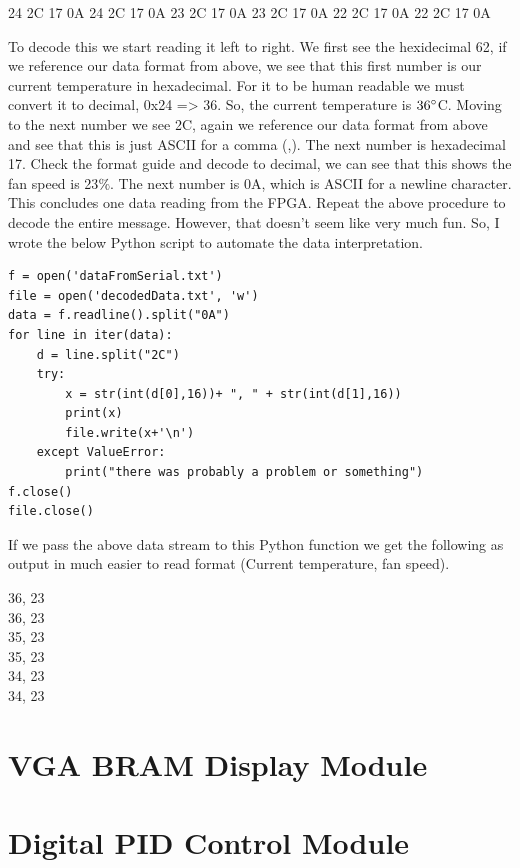 \documentclass{article}
\begin{document}
\begin{center}
	24 2C 17 0A 24 2C 17 0A 23 2C 17 0A 23 2C 17 0A 22 2C 17 0A 22 2C 17 0A\\
\end{center}
To decode this we start reading it left to right. We first see the hexidecimal 62, if we reference our data format from above, we see that this first number is our current temperature in hexadecimal. For it to be human readable we must convert it to decimal, 0x24 => 36. So, the current temperature is $36\degree$C. Moving to the next number we see 2C, again we reference our data format from above and see that this is just ASCII for a comma (,). The next number is hexadecimal 17. Check the format guide and decode to decimal, we can see that this shows the fan speed is 23$\%$. The next number is 0A, which is ASCII for a newline character. This concludes one data reading from the FPGA. Repeat the above procedure to decode the entire message. However, that doesn't seem like very much fun. So, I wrote the below Python script to automate the data interpretation.

\begin{lstlisting}
f = open('dataFromSerial.txt')
file = open('decodedData.txt', 'w')
data = f.readline().split("0A")
for line in iter(data):
	d = line.split("2C")
	try:
		x = str(int(d[0],16))+ ", " + str(int(d[1],16))
		print(x)
		file.write(x+'\n')
	except ValueError:
		print("there was probably a problem or something")
f.close()
file.close()
\end{lstlisting}
If we pass the above data stream to this Python function we get the following as output in much easier to read format (Current temperature, fan speed).
\begin{center}
36, 23\\
36, 23\\
35, 23\\
35, 23\\
34, 23\\
34, 23\\
\end{center}

\section{VGA BRAM Display Module}
\section{Digital PID Control Module}
\end{document}
